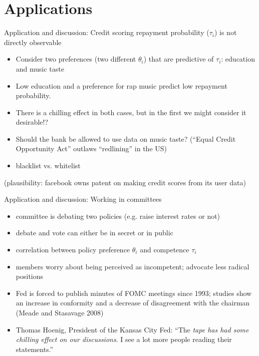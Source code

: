 \documentclass[bigger]{beamer}
\begin{document}
\section{Applications}
\label{sec:orgheadline22}
\begin{frame}[label={sec:orgheadline20}]{Application and discussion: Credit scoring}
repayment probability (\(\tau_{i}\)) is not directly observable
\begin{itemize}
\item Consider two preferences (two different \(\theta_{i}\)) that are predictive of \(\tau_{i}\): education and music taste
\item Low education and a preference for rap music predict low repayment probability.
\item There is a chilling effect in both cases, but in the first we might consider it desirable!?
\item Should the bank be allowed to use data on music taste? (``Equal Credit Opportunity Act'' outlaws ``redlining'' in the US)
\item blacklist vs. whitelist
\end{itemize}

\vspace*{0.6cm}
\begin{footnotesize}
(plausibility: facebook owns patent on making credit scores from its user data)
\end{footnotesize}
\end{frame}

\begin{frame}[label={sec:orgheadline21}]{Application and discussion: Working in committees}
\begin{itemize}
\item committee is debating two policies (e.g. raise interest rates or not)
\item debate and vote can either be in secret or in public
\item correlation between policy preference \(\theta_{i}\) and competence \(\tau_{i}\)
\item members worry about being perceived as incompetent; advocate less radical positions
\item Fed is forced to publish minutes of FOMC meetings since 1993; \linebreak studies show an increase in conformity and a decrease of disagreement with the chairman (Meade and Stasavage 2008)
\item Thomas Hoenig, President of the Kansas City Fed: ``The \emph{tape has had some chilling effect on our discussions}. I see a lot more people reading their statements.''
\end{itemize}
\end{frame}
\end{document}
